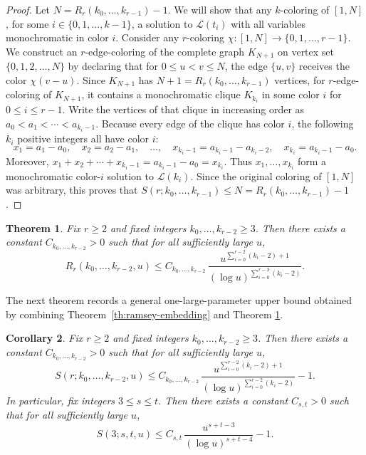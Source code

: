 \documentclass[twoside, 12pt]{article}
\newtheorem{theorem}{Theorem}
\newtheorem{corollary}[theorem]{Corollary}
\begin{document}
\begin{proof}
Let $N=R_r(k_0,\dots,k_{r-1})-1.$ We will show that any $k$-coloring of $[1,N]$, for some $i \in \{0,1,\dots,k-1\}$, a solution to $\mathcal{L}(t_i)$ with all variables monochromatic in color $i$. Consider any $r$-coloring
$\chi:[1,N]\to\{0,1,\dots,r-1\}$.
We construct an $r$-edge-coloring of the complete graph $K_{N+1}$ on vertex set
$\{0,1,2,\dots,N\}$
by declaring that for $0\le u<v\le N$, the edge $\{u,v\}$ receives the color $\chi(v-u).$
Since $K_{N+1}$ has $N+1=R_r(k_0,\dots,k_{r-1})$ vertices, for $r$-edge-coloring of $K_{N+1}$, it contains a monochromatic clique
$K_{k_i}$ in some color $i$ for $0 \leq i \leq r-1$. Write the vertices of that clique in increasing order as
$a_0<a_1<\cdots<a_{k_i-1}$.
Because every edge of the clique has color $i$, the following $k_i$ positive integers all have color $i$:
\[
x_1=a_1-a_0,\quad x_2=a_2-a_1,\quad \dots,\quad x_{k_i-1}=a_{k_i-1}-a_{k_i-2},\quad x_{k_i}=a_{k_i-1}-a_0.
\]
Moreover,
$x_1+x_2+\cdots+x_{k_i-1}=a_{k_i-1}-a_0=x_{k_i}$.
Thus $x_1,\dots,x_{k_i}$ form a monochromatic color-$i$ solution to $\mathcal{L}(k_i)$.
Since the original coloring of $[1,N]$ was arbitrary, this proves that
$S(r;k_0,\dots,k_{r-1})\le N=R_r(k_0,\dots,k_{r-1})-1$.
\end{proof}




\begin{theorem}{\upshape \cite{HeWigderson2020}}\label{HeWigderson2020}
Fix $r\ge 2$ and fixed integers $k_0,\dots,k_{r-2}\ge 3$.
Then there exists a constant $C_{k_0,\dots,k_{r-2}}>0$ such that for all sufficiently large $u$,
\[
R_r(k_0,\dots,k_{r-2},u)
\le
C_{k_0,\dots,k_{r-2}}\,\frac{u^{\sum_{i=0}^{r-2}(k_i-2)+1}}{(\log u)^{\sum_{i=0}^{r-2}(k_i-2)}}.
\]
\end{theorem}


The next theorem records a general one-large-parameter upper bound obtained by combining
Theorem~\ref{th:ramsey-embedding} and Theorem \ref{HeWigderson2020}.


\begin{corollary}\label{coroll-2}
Fix $r\ge 2$ and fixed integers $k_0,\dots,k_{r-2}\ge 3$.
Then there exists a constant $C_{k_0,\dots,k_{r-2}}>0$ such that for all sufficiently large $u$,
\[
S(r;k_0,\dots,k_{r-2},u)
\le
C_{k_0,\dots,k_{r-2}}\,\frac{u^{\sum_{i=0}^{r-2}(k_i-2)+1}}{(\log u)^{\sum_{i=0}^{r-2}(k_i-2)}}-1.
\]
In particular, fix integers $3\le s\le t$.  Then there exists a constant $C_{s,t}>0$ such that for all sufficiently large $u$,
\[
S(3;s,t,u)\le C_{s,t}\,\frac{u^{s+t-3}}{(\log u)^{s+t-4}}-1.
\]
\end{corollary}
\end{document}
